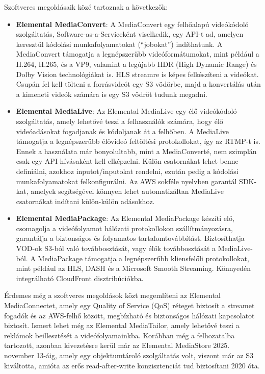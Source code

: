 Szoftveres megoldásaik közé tartoznak a következők: 

\begin{itemize}
  \item \textbf{Elemental MediaConvert}: A MediaConvert egy felhőalapú videókódoló szolgáltatás, Software-as-a-Serviceként viselkedik, egy API-t ad, amelyen keresztül kódolási munkafolyamatokat (``jobokat'') indíthatunk. A MediaConvert támogatja a legnépszerűbb videóformátumokat, mint például a H.264, H.265, és a VP9, valamint a legújabb HDR (High Dynamic Range) és Dolby Vision technológiákat is. HLS streamre is képes felkészíteni a videókat. Csupán fel kell tölteni a forrásvideót egy S3 vödörbe, majd a konvertálás után a kimeneti videók számára is egy S3 vödröt tudunk megadni.
  \item \textbf{Elemental MediaLive}: Az Elemental MediaLive egy élő videókódoló szolgáltatás, amely lehetővé teszi a felhasználók számára, hogy élő videóadásokat fogadjanak és kódoljanak át a felhőben. A MediaLive támogatja a legnépszerűbb élővideó feltöltési protokollokat, így az RTMP-t is. Ennek a használata már bonyolultabb, mint a MediaConverté, nem szimplán csak egy API hívásaként kell elképzelni. Külön csatornákat lehet benne definiálni, azokhoz inputot/inputokat rendelni, ezután pedig a kódolási munkafolyamatokat felkonfigurálni. Az AWS sokféle nyelvben garantál SDK-kat, amelyek segítségével könnyen lehet automatizáltan MediaLive csatornákat indítani külön-külön adásokhoz.
  \item \textbf{Elemental MediaPackage}: Az Elemental MediaPackage készíti elő, csomagolja a videófolyamot hálózati protokollokon szállítmányozásra, garantálja a biztonságos és folyamatos tartalomtovábbítást. Biztosíthatja VOD-ok S3-ból való továbbosztását, vagy élők továbbosztását a MediaLive-ból. A MediaPackage támogatja a legnépszerűbb kliensfelőli protokollokat, mint például az HLS, DASH és a Microsoft Smooth Streaming. Könnyedén integrálható CloudFront disztribúciókba.
\end{itemize}

Érdemes még a szoftveres megoldások közt megemlíteni az Elemental MediaConnectet, amely egy Quality of Service (QoS) réteget biztosít a streamet fogadók és az AWS-felhő között, megbízható és biztonságos hálózati kapcsolatot biztosít. Ismert lehet még az Elemental MediaTailor, amely lehetővé teszi a reklámok beillesztését a videófolyamainkba. Korábban még a felhozatalba tartozott, azonban kivezetésre kerül már az Elemental MediaStore 2025. november 13-áig, amely egy objektumtároló szolgáltatás volt, viszont már az S3 kiváltotta, amióta az erős read-after-write konzisztenciát tud biztosítani 2020 óta. \cite{Mediastore}

